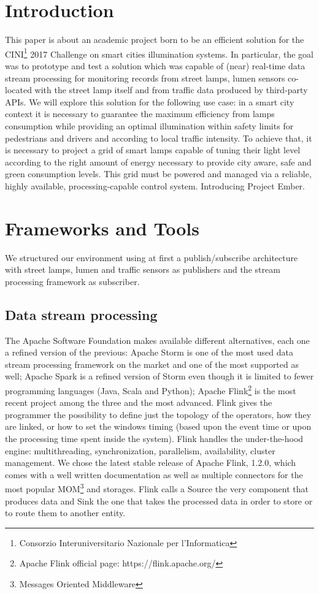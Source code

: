 \section{Introduction}
This paper is about an academic project born to be an efficient solution for the CINI\footnote{Consorzio Interuniversitario Nazionale per l'Informatica} 2017 Challenge on smart cities illumination systems. In particular, the goal was to prototype and test a solution which was capable of (near) real-time data stream processing for monitoring records from street lamps, lumen sensors co-located with the street lamp itself and from traffic data produced by third-party APIs. We will explore this solution for the following use case: in a smart city context it is necessary to guarantee the maximum efficiency from lamps consumption while providing an optimal illumination within safety limits for pedestrians and drivers and according to local traffic intensity. To achieve that, it is necessary to project a grid of smart lamps capable of tuning their light level according to the right amount of energy necessary to provide city aware, safe and green consumption levels. This grid must be powered and managed via a reliable, highly available, processing-capable control system. Introducing Project Ember.


\section{Frameworks and Tools}
We structured our environment using at first a publish/subscribe architecture with street lamps, lumen and traffic sensors as publishers and the stream processing framework as subscriber. 

\subsection{Data stream processing}
The Apache Software Foundation makes available different alternatives, each one a refined version of the previous: Apache Storm is one of the most used data stream processing framework on the market and one of the most supported as well; Apache Spark is a refined version of Storm even though it is limited to fewer programming languages (Java, Scala and Python); Apache Flink\footnote{Apache Flink official page: https://flink.apache.org/} is the most recent project among the three and the most advanced. Flink gives the programmer the possibility to define just the topology of the operators, how they are linked, or how to set the windows timing (based upon the event time or upon the processing time spent inside the system). Flink handles the under-the-hood engine: multithreading, synchronization, parallelism, availability, cluster management. We chose the latest stable release of Apache Flink, 1.2.0, which comes with a well written documentation as well as multiple connectors for the most popular MOM\footnote{Messages Oriented Middleware} and storages. Flink calls a Source the very component that produces data and Sink the one that takes the processed data in order to store or to route them to another entity.

